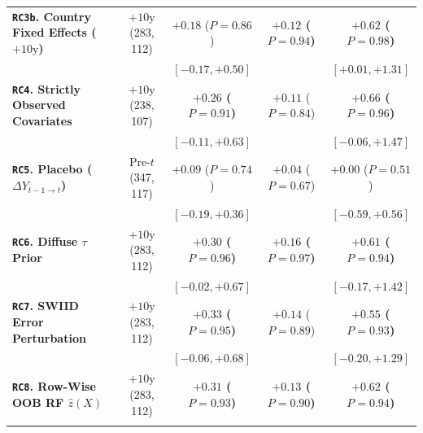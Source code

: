 \documentclass[11pt,a4paper]{article}
\newcommand{\co}{\cellcolor{colodd}}
\newcommand{\ce}{\cellcolor{coleven}}
\begin{document}
\begin{table}[htbp]
{\begin{tabular}{l|c|c|c|c}
    \textbf{\texttt{RC3b}. Country Fixed Effects ($+10\text{y}$)} & \ce $+10\text{y}$ (283, 112) & $+0.18$ ($P=0.86$) & \ce \textbf{$+0.12$ ($P=0.94$)} & \textbf{$+0.62$ ($P=0.98$)} \\
    \rowcolor{roweven}
                                                      & \ce & {\scriptsize $[-0.17, +0.50]$} & \ce {\scriptsize $[-0.04, +0.26]$} & {\scriptsize $[+0.01, +1.31]$} \\
    \hline
    \rowcolor{rowodd}
    \textbf{\texttt{RC4}. Strictly Observed Covariates}& \co $+10\text{y}$ (238, 107) & \textbf{$+0.26$ ($P=0.91$)} & \co $+0.11$ ($P=0.84$) & \textbf{$+0.66$ ($P=0.96$)} \\
    \rowcolor{rowodd}
                                                      & \co & {\scriptsize $[-0.11, +0.63]$} & \co {\scriptsize $[-0.09, +0.35]$} & {\scriptsize $[-0.06, +1.47]$} \\
    \hline
    \rowcolor{roweven}
    \textbf{\texttt{RC5}. Placebo ($\Delta Y_{t-1\to t}$)}& \ce Pre-$t$ (347, 117) & $+0.09$ ($P=0.74$) & \ce $+0.04$ ($P=0.67$) & $+0.00$ ($P=0.51$) \\
    \rowcolor{roweven}
                                                      & \ce & {\scriptsize $[-0.19, +0.36]$} & \ce {\scriptsize $[-0.11, +0.18]$} & {\scriptsize $[-0.59, +0.56]$} \\
    \hline
    \rowcolor{rowodd}
    \textbf{\texttt{RC6}. Diffuse $\tau$ Prior} & \co $+10\text{y}$ (283, 112) & \textbf{$+0.30$ ($P=0.96$)} & \co \textbf{$+0.16$ ($P=0.97$)} & \textbf{$+0.61$ ($P=0.94$)} \\
    \rowcolor{rowodd}
                                                      & \co & {\scriptsize $[-0.02, +0.67]$} & \co {\scriptsize $[-0.01, +0.34]$} & {\scriptsize $[-0.17, +1.42]$} \\
    \hline
    \rowcolor{roweven}
    \textbf{\texttt{RC7}. SWIID Error Perturbation} & \ce $+10\text{y}$ (283, 112) & \textbf{$+0.33$ ($P=0.95$)} & \ce $+0.14$ ($P=0.89$) & \textbf{$+0.55$ ($P=0.93$)} \\
    \rowcolor{roweven}
                                                      & \ce & {\scriptsize $[-0.06, +0.68]$} & \ce {\scriptsize $[-0.09, +0.35]$} & {\scriptsize $[-0.20, +1.29]$} \\
    \hline
    \rowcolor{rowodd}
    \textbf{\texttt{RC8}. Row-Wise OOB RF $\hat{z}(X)$}& \co $+10\text{y}$ (283, 112) & \textbf{$+0.31$ ($P=0.93$)} & \co \textbf{$+0.13$ ($P=0.90$)} & \textbf{$+0.62$ ($P=0.94$)} \\
    \rowcolor{rowodd}

\end{tabular}}
\end{table}
\end{document}
